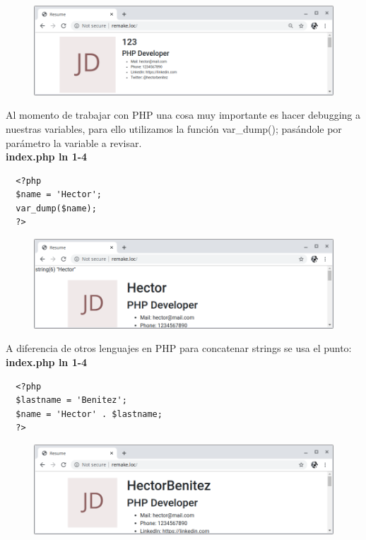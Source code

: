 \documentclass{article}
\begin{document}
\begin{figure}[h!]
  \centering
  \includegraphics[scale=0.5]{./Pictures/013_variables.png}
\end{figure}

Al momento de trabajar con PHP una cosa muy importante es hacer debugging a
nuestras variables, para ello utilizamos la función var\_dump(); pasándole por
parámetro la variable a revisar.\\

\textbf{index.php ln 1-4}
\begin{verbatim}
  <?php
  $name = 'Hector';
  var_dump($name);
  ?>
\end{verbatim}

\begin{figure}[h!]
  \centering
  \includegraphics[scale=0.5]{./Pictures/014_vardump.png}
\end{figure}

\newpage

A diferencia de otros lenguajes en PHP para concatenar strings se usa el
punto:\\

\textbf{index.php ln 1-4}
\begin{verbatim}
  <?php
  $lastname = 'Benitez';
  $name = 'Hector' . $lastname;
  ?>
\end{verbatim}

\begin{figure}[h!]
  \centering
  \includegraphics[scale=0.5]{./Pictures/015_concatenar_punto.png}
\end{figure}
\end{document}
